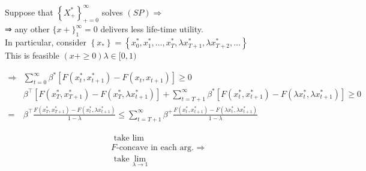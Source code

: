 \documentclass[10pt]{article}
\begin{document}
Suppose that $\left\{X_{+}^{*}\right\}_{+=0}^{\infty}$ solves $(S P) \Rightarrow$\\
⇒ any other $\{x+\}_{1}^{\infty}=0$ delivers less life-time utility.\\
In particular, consider $\left\{x_{*}\right\}=\left\{x_{0}^{*}, x_{1}^{*}, \ldots, x_{T}^{*}, \lambda x_{T+1}^{*}, \lambda x_{T+2}^{*}, \ldots\right\}$\\
This is feasible $(x+\geq 0) \lambda \in[0,1)$

$$
\begin{aligned}
\Rightarrow & \sum_{t=0}^{\infty} \beta^{*}\left[F\left(x_{t}^{*}, x_{t+1}^{*}\right)-F\left(x_{t}, x_{t+1}\right)\right] \geqslant 0 \\
& \beta^{\top}\left[F\left(x_{T}^{*}, x_{T+1}^{*}\right)-F\left(x_{T}^{*}, \lambda x_{t+1}^{*}\right)\right]+\sum_{t=T+1}^{\infty} \beta^{*}\left[F\left(x_{t}^{*}, x_{t+1}^{*}\right)-F\left(\lambda x_{t}^{*}, \lambda x_{t+1}^{*}\right)\right] \geqslant 0 \\
= & \beta^{\top} \frac{F\left(x_{T}^{*}, x_{T+1}^{*}\right)-F\left(x_{t}^{*}, \lambda x_{t+1}^{*}\right)}{1-\lambda} \leqslant \sum_{t=T+1}^{\infty} \beta^{+} \frac{F\left(x_{t}^{*}, x_{t+1}^{*}\right)-F\left(\lambda x_{t}^{*}, \lambda x_{t+1}^{*}\right)}{1-\lambda}
\end{aligned}
$$

$$
\begin{aligned}
& \text { take lim } \\
& F \text {-concave in each arg. ⇒ } \\
& \text { take } \lim _{\lambda \rightarrow 1}
\end{aligned}
$$
\end{document}
